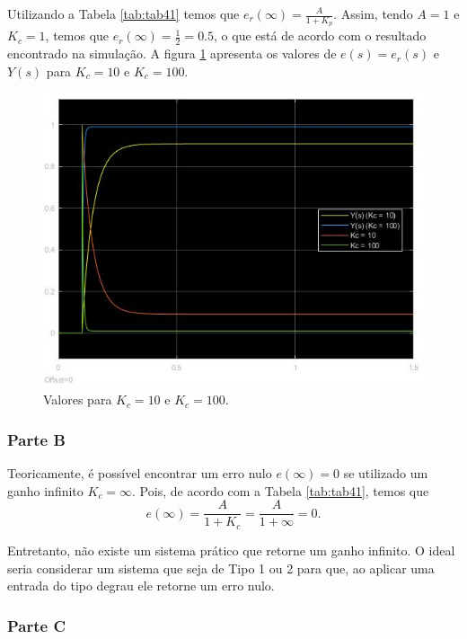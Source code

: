 \documentclass[
]{book}
\begin{document}
Utilizando a Tabela \ref{tab:tab41} temos que \(e_r(\infty)=\frac{A}{1 + K_p}\). Assim, tendo \(A = 1\) e \(K_c = 1\), temos que \(e_r(\infty) = \frac {1}{2} = 0.5\), o que está de acordo com o resultado encontrado na simulação. A figura \ref{fig:fig41A2} apresenta os valores de \(e(s) = e_r(s)\) e \(Y(s)\) para \(K_c = 10\) e \(K_c = 100\).

\begin{figure}
\includegraphics[width=0.8\linewidth]{Imagens/Lab4/Resolução/prob1A2} \caption{Valores para $K_c = 10$ e $K_c = 100$.}\label{fig:fig41A2}
\end{figure}

\hypertarget{parte-b}{%
\subsubsection*{Parte B}\label{parte-b}}

Teoricamente, é possível encontrar um erro nulo \(e(\infty) = 0\) se utilizado um ganho infinito \(K_c = \infty\). Pois, de acordo com a Tabela \ref{tab:tab41}, temos que
\[
e(\infty) = \frac {A}{1+K_c} = \frac {A}{1+\infty} = 0.
\]

Entretanto, não existe um sistema prático que retorne um ganho infinito. O ideal seria considerar um sistema que seja de Tipo 1 ou 2 para que, ao aplicar uma entrada do tipo degrau ele retorne um erro nulo.

\hypertarget{parte-c}{%
\subsubsection*{Parte C}\label{parte-c}}
\end{document}
